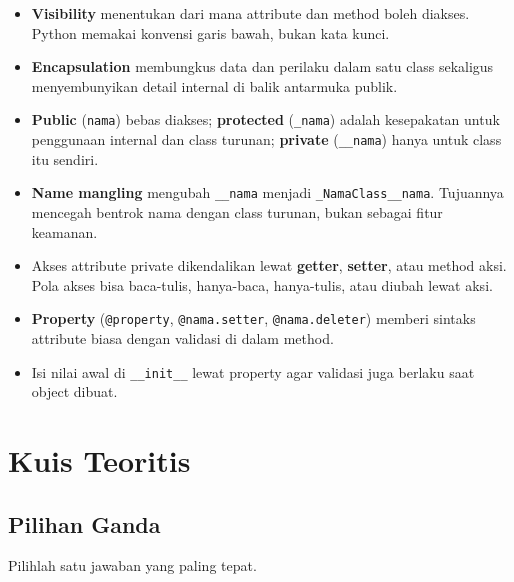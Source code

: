 \begin{itemize}
  \item \textbf{Visibility} menentukan dari mana attribute dan method boleh diakses. Python memakai konvensi garis bawah, bukan kata kunci.
  \item \textbf{Encapsulation} membungkus data dan perilaku dalam satu class sekaligus menyembunyikan detail internal di balik antarmuka publik.
  \item \textbf{Public} (\texttt{nama}) bebas diakses; \textbf{protected} (\texttt{\_nama}) adalah kesepakatan untuk penggunaan internal dan class turunan; \textbf{private} (\texttt{\_\_nama}) hanya untuk class itu sendiri.
  \item \textbf{Name mangling} mengubah \texttt{\_\_nama} menjadi \texttt{\_NamaClass\_\_nama}. Tujuannya mencegah bentrok nama dengan class turunan, bukan sebagai fitur keamanan.
  \item Akses attribute private dikendalikan lewat \textbf{getter}, \textbf{setter}, atau method aksi. Pola akses bisa baca-tulis, hanya-baca, hanya-tulis, atau diubah lewat aksi.
  \item \textbf{Property} (\texttt{@property}, \texttt{@nama.setter}, \texttt{@nama.deleter}) memberi sintaks attribute biasa dengan validasi di dalam method.
  \item Isi nilai awal di \texttt{\_\_init\_\_} lewat property agar validasi juga berlaku saat object dibuat.
\end{itemize}

\section{Kuis Teoritis}

\subsection{Pilihan Ganda}

Pilihlah satu jawaban yang paling tepat.

